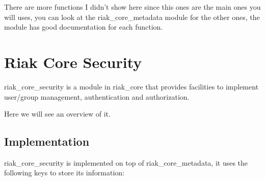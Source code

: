 \documentclass[letterpaper,10pt,english]{sphinxmanual}
\begin{document}
There are more functions I didn't show here since this ones are the main ones
you will uses, you can look at the riak\_core\_metadata module for the other ones,
the module has good documentation for each function.


\chapter{Riak Core Security}
\label{riak_core_security:riak-core-security}\label{riak_core_security::doc}
riak\_core\_security is a module in riak\_core that provides facilities to
implement user/group management, authentication and authorization.

Here we will see an overview of it.


\section{Implementation}
\label{riak_core_security:implementation}
riak\_core\_security is implemented on top of riak\_core\_metadata, it uses the
following keys to store its information:
\end{document}
